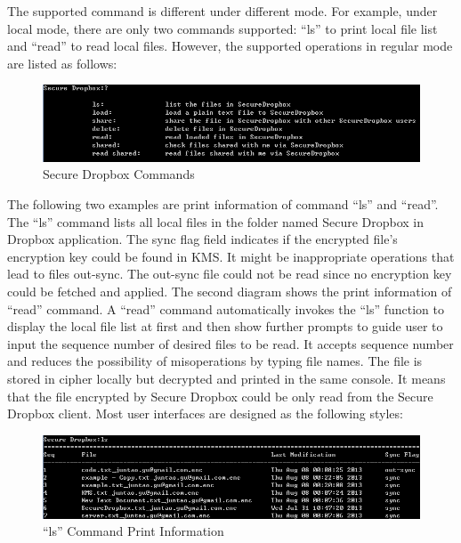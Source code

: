 The supported command is different under different mode. For example, under local mode, there are only two commands supported: ``ls'' to print local file list and ``read'' to read local files. However, the supported operations in regular mode are listed as follows:

\begin{figure}[h]
        \centering
        \includegraphics[width=1.0\textwidth]{figures/Supported_Commands_by_Secure_Dropbox.png}
        \caption[Secure Dropbox Commands] {Secure Dropbox Commands}
\end{figure}

The following two examples are print information of command ``ls'' and ``read''. The ``ls'' command lists all local files in the folder named Secure Dropbox in Dropbox application. The sync flag field indicates if the encrypted file’s encryption key could be found in KMS. It might be inappropriate operations that lead to files out-sync. The out-sync file could not be read since no encryption key could be fetched and applied. The second diagram shows the print information of ``read'' command. A ``read'' command automatically invokes the ``ls'' function to display the local file list at first and then show further prompts to guide user to input the sequence number of desired files to be read. It accepts sequence number and reduces the possibility of misoperations by typing file names. The file is stored in cipher locally but decrypted and printed in the same console. It means that the file encrypted by Secure Dropbox could be only read from the Secure Dropbox client. Most user interfaces are designed as the following styles:

\begin{figure}[h]
        \centering
        \includegraphics[width=1.0\textwidth]{figures/Command_Print_Information.png}
        \caption[Command Print Information] {``ls'' Command Print Information}
\end{figure}

